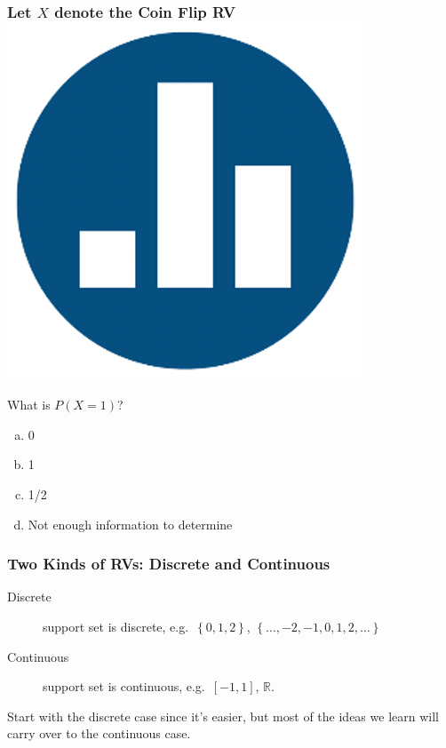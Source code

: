 \begin{frame}
  \frametitle{Let $X$ denote the Coin Flip RV \hfill\includegraphics[scale = 0.05]{./images/clicker}}
  What is $P\left( X=1 \right)$?

  \vspace{1em}

  \begin{enumerate}[(a)]
    \item 0 
    \item 1  
    \item 1/2 
    \item Not enough information to determine
  \end{enumerate}
\end{frame}
\begin{frame}
  \frametitle{Two Kinds of RVs: Discrete and Continuous}
  \begin{description}
    \item[Discrete] support set is discrete, e.g.\ $\left\{ 0,1,2 \right\}$,  $\left\{ \hdots, -2, -1, 0, 1, 2,\hdots \right\}$
    \item[Continuous] support set is continuous, e.g.\ $[-1,1]$, $\mathbb{R}$.
  \end{description}

  \vspace{1em}

  \alert{Start with the discrete case since it's easier, but most of the ideas we learn will carry over to the continuous case.}
\end{frame}
